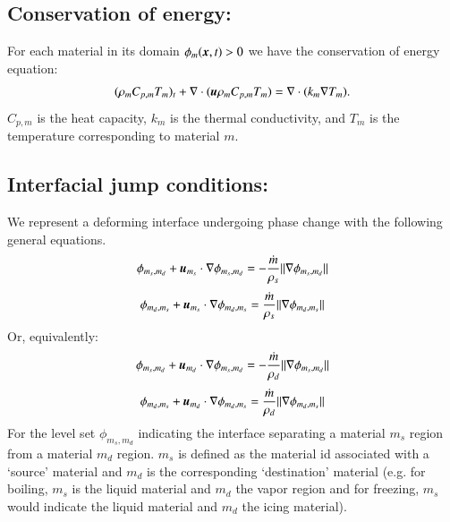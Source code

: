 \documentclass[preprint,12pt]{Definitions/elsarticle}
\newcommand{\tn}{\textnormal}
\newcommand{\bmu}{\mbox{\boldmath $u$\unboldmath}}
\newcommand{\bmx}{\mbox{\boldmath $x$\unboldmath}}
\begin{document}
\subsection{Conservation of energy:} 
\noindent For each material in its domain $\phi_{m}(\bmx,t)>0$ we have the conservation of energy equation:
\begin{equation}
\label{eq:heat}
(\rho_{m}C_{p,m}T_{m})_t+
\nabla\cdot(\bmu\rho_{m}C_{p,m}T_{m})=
\nabla\cdot ( k_{m}\nabla T_{m}).
\end{equation}
$C_{p,m}$ is the heat capacity, $k_{m}$ is the thermal conductivity, and $T_{m}$ is the temperature corresponding to material $m$. 


\subsection{Interfacial jump conditions:}
\noindent We represent a deforming interface undergoing phase change with the following general equations.
\begin{eqnarray}
\phi_{m_{s},m_{d}} + 
\bmu_{m_{s}}\cdot\nabla\phi_{m_{s},m_{d}} =
-\frac{\dot{m}}{\rho_{s}}||\nabla\phi_{m_{s},m_{d}}||
\end{eqnarray}
\begin{eqnarray}
\phi_{m_{d},m_{s}} + 
\bmu_{m_{s}}\cdot\nabla\phi_{m_{d},m_{s}} =
\frac{\dot{m}}{\rho_{s}}||\nabla\phi_{m_{d},m_{s}}||
\end{eqnarray}
Or, equivalently:
\begin{eqnarray}
\phi_{m_{s},m_{d}} + 
\bmu_{m_{d}}\cdot\nabla\phi_{m_{s},m_{d}} =
-\frac{\dot{m}}{\rho_{d}}||\nabla\phi_{m_{s},m_{d}}||
\end{eqnarray}
\begin{eqnarray}
\phi_{m_{d},m_{s}} + 
\bmu_{m_{d}}\cdot\nabla\phi_{m_{d},m_{s}} =
\frac{\dot{m}}{\rho_{d}}||\nabla\phi_{m_{d},m_{s}}||
\end{eqnarray}
For the level set $\phi_{m_{s},m_{d}}$ indicating the interface separating a material $m_{s}$ region from a
material $m_{d}$ region.
$m_{s}$ is defined as the material id associated with a `source' material 
and $m_{d}$ is the corresponding `destination' material (e.g. for boiling, $m_s$ is the liquid material and $m_d$ the vapor region and for freezing, $m_s$ would indicate the liquid material and $m_d$ the icing material). \\
\end{document}
